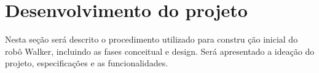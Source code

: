 \chapter{Desenvolvimento do projeto}
\label{chap:metod}
Nesta seção será descrito o procedimento utilizado para constru
ção inicial do robô Walker, incluindo as fases conceitual e design.  
Será apresentado a ideação do projeto, especificações e as funcionalidades.


\begin{comment}
\section{Ideação}

\subsection{Arquitetura Geral}
 A arquitetura geral, apresentada na Figura \ref{fig:Arquitetura geral}, 
 relaciona de modo geral a interface do usuário, com a central de 
 gerenciamento do sistema e com a interface com hardware. Neste contexto, 
 a interface do usuário representa o contato direto com o usuário por meio 
 de um botão \textit{on/off}, um \textit{joystick} e por acesso remoto, 
 através de um computador devidamente conectado.

 \begin{figure} [h!]	
    \centering

    \caption{Arquitetura Geral}
    \texttt{[image: general\_architecture]}
    \caption*{Fonte: Autoria própria.}
    \label{fig:Arquitetura geral}
\end{figure}	

Para a central de gerenciamento do sistema utilizou-se o sistema 
operacional \textit{Ubuntu} 20.04 junto ao framework de robótica ROS 
\textit{Noetic}. Neste cojunto se encontram as principais funcionalidades 
do robô: percepção, navegação, detecção e controle. Por fim, no conjunto 
de saídas estão os atuadores e os alertas sonoro e luminoso.

\subsection{Requisitos técnicos}

\subsection{Quality Function Deployment}
\textit{Quality Function Deployment} é uma ferramenta de qualidade que 
auxilia na conversão das demandas do cliente em características de 
qualidade do produto. Dessa forma, no primeiro ciclo do QFD foram 
analisados os requisistos do cliente e os requisitos técnicos necessários
, sinalizando os pontos mais importantes e as relações entre estes. 
O resultado foi exposto na \ref{fig:QFD}


\end{comment}
